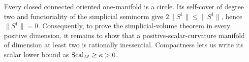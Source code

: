 Every closed connected oriented one-manifold is a circle. Its self-cover of
degree two and functoriality of the simplicial seminorm give
$2\|S^1\|\le\|S^1\|$, hence $\|S^1\|=0$. Consequently, to prove the
simplicial-volume theorem in every positive dimension, it remains to show
that a positive-scalar-curvature manifold of dimension at least two is
rationally inessential. Compactness lets us write its scalar lower bound as
$\operatorname{Scal}_M\ge\kappa>0$.
